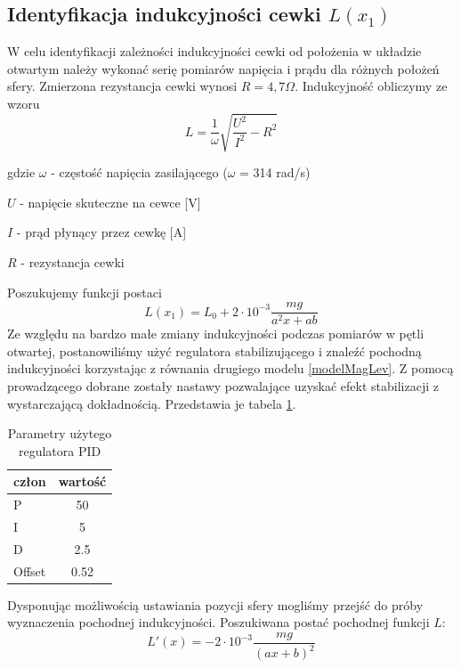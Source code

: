 \subsection{Identyfikacja indukcyjności cewki $L(x_1)$}

W celu identyfikacji zależności indukcyjności cewki od położenia w układzie otwartym należy wykonać serię pomiarów napięcia i prądu dla różnych położeń sfery. Zmierzona rezystancja cewki wynosi $R = 4,7\Omega$. Indukcyjność obliczymy ze wzoru
\begin{equation}
L = \dfrac{1}{\omega}\sqrt{\dfrac{U^2}{I^2} - R^2}
\end{equation}

gdzie
$\omega$ - częstość napięcia zasilającego ($\omega$ = 314 rad/s)

$U$ - napięcie skuteczne na cewce [V]

$I$ - prąd płynący przez cewkę [A]

$R$ - rezystancja cewki


Poszukujemy funkcji postaci
\begin{equation}
L(x_1) = L_0 + 2 \cdot 10^{-3} \dfrac{mg}{a^2x + ab}
\end{equation}
Ze względu na bardzo małe zmiany indukcyjności podczas pomiarów w pętli otwartej, postanowiliśmy użyć regulatora stabilizującego i znaleźć pochodną indukcyjności korzystając z równania drugiego modelu \ref{modelMagLev}.
Z pomocą prowadzącego dobrane zostały nastawy pozwalające uzyskać efekt stabilizacji z wystarczającą dokładnością. Przedstawia je tabela \ref{tab:parametryPID}.

\begin{table}[ht]
\begin{center}
  \begin{tabular}{| l | c | }
    \hline
    człon & wartość \\ \hline
    P 		& 50 \\ \hline
    I 		& 5 \\ \hline
    D 		& 2.5 \\ \hline
    Offset 	& 0.52 \\
    \hline

  \end{tabular}
  \caption{Parametry użytego regulatora PID}
  \label{tab:parametryPID}
\end{center}
\end{table}

Dysponując możliwością ustawiania pozycji sfery mogliśmy przejść do próby wyznaczenia pochodnej indukcyjności. Poszukiwana postać pochodnej funkcji $L$:
\begin{equation} \label{eq:L'}
L'(x) = - 2 \cdot 10^{-3}\dfrac{mg}{(ax + b)^2}
\end{equation}

